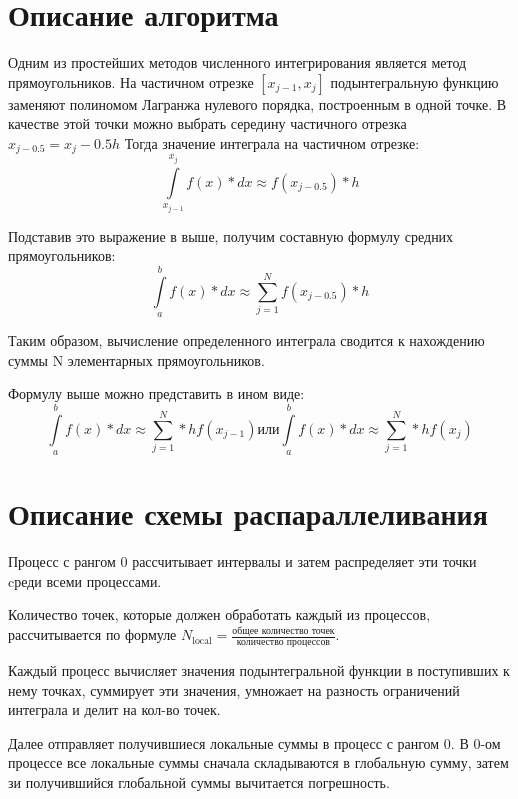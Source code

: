 \documentclass{report}
\begin{document}
\section*{Описание алгоритма}
\par 
Одним из простейших методов численного интегрирования является метод прямоугольников. На частичном отрезке $[x_{ j-1},x_j]$ подынтегральную функцию заменяют полиномом Лагранжа нулевого порядка, построенным в одной точке. В качестве этой точки можно выбрать середину частичного отрезка $x_{j-0.5} = x_j-0.5h $ Тогда значение интеграла на частичном отрезке:
$$\int \limits_{x_{j-1}}^{x_j}  f(x)*dx\approx f(x_{j- 0.5})*h  $$
\par
Подставив это выражение в выше, получим составную формулу средних прямоугольников:
$$\int \limits_a^{b}  f(x)*dx\approx \sum_{j=1}^N f(x_{j- 0.5})*h  $$
\par 
Таким образом, вычисление определенного интеграла сводится к нахождению суммы N элементарных прямоугольников.
\par
Формулу выше можно представить в ином виде:
$$\int \limits_a^{b}  f(x)*dx\approx \sum_{j=1}^N *h  f(x_{j- 1})  или \int \limits_a^{b}  f(x)*dx\approx \sum_{j=1}^N *h  f(x_j)  $$

\newpage

\section*{Описание схемы распараллеливания}
\par 
Процесс с рангом 0 рассчитывает интервалы и затем распределяет эти точки cреди всеми процессами. 
\par 
Количество точек, которые должен обработать каждый из процессов, рассчитывается по формуле $N_{\text{local}} = \frac{\text{общее количество точек}}{\text{количество процессов}}$.
\par
 Каждый процесс вычисляет значения подынтегральной функции в поступивших к нему точках, суммирует эти значения, умножает на разность ограничений интеграла и делит на кол-во точек.
\par
Далее отправляет получившиеся локальные суммы в процесс с рангом 0. В 0-ом процессе все локальные суммы сначала складываются в глобальную сумму, затем зи получившийся глобальной суммы вычитается погрешность.

\newpage
\end{document}

